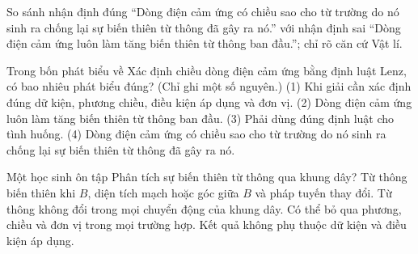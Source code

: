 \begin{bt}
So sánh nhận định đúng “Dòng điện cảm ứng có chiều sao cho từ trường do nó sinh ra chống lại sự biến thiên từ thông đã gây ra nó.” với nhận định sai “Dòng điện cảm ứng luôn làm tăng biến thiên từ thông ban đầu.”; chỉ rõ căn cứ Vật lí.
\end{bt}

\begin{ex}
Trong bốn phát biểu về Xác định chiều dòng điện cảm ứng bằng định luật Lenz, có bao nhiêu phát biểu đúng? (Chỉ ghi một số nguyên.) (1) Khi giải cần xác định đúng dữ kiện, phương chiều, điều kiện áp dụng và đơn vị. (2) Dòng điện cảm ứng luôn làm tăng biến thiên từ thông ban đầu. (3) Phải dùng đúng định luật cho tình huống. (4) Dòng điện cảm ứng có chiều sao cho từ trường do nó sinh ra chống lại sự biến thiên từ thông đã gây ra nó.
\end{ex}

\begin{ex}
Một học sinh ôn tập Phân tích sự biến thiên từ thông qua khung dây?
\choice
{\True Từ thông biến thiên khi $B$, diện tích mạch hoặc góc giữa $B$ và pháp tuyến thay đổi.}
{Từ thông không đổi trong mọi chuyển động của khung dây.}
{Có thể bỏ qua phương, chiều và đơn vị trong mọi trường hợp.}
{Kết quả không phụ thuộc dữ kiện và điều kiện áp dụng.}
\end{ex}

